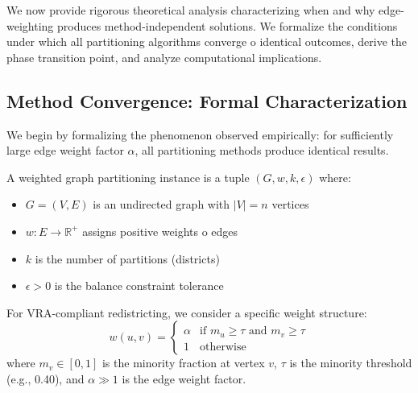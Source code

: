 \label{sec:theory}

We now provide rigorous theoretical analysis characterizing when and why edge-weighting produces method-independent solutions. We formalize the conditions under which all partitioning algorithms converge 	o identical outcomes, derive the phase transition point, and analyze computational implications.

\subsection{Method Convergence: Formal Characterization}

We begin by formalizing the phenomenon observed empirically: for sufficiently large edge weight factor $\alpha$, all partitioning methods produce identical results.

\begin{definition}
A weighted graph partitioning instance is a tuple $(G, w, k, \epsilon)$ where:
\begin{itemize}
    \item $G = (V, E)$ is an undirected graph with $|V| = n$ vertices
    \item $w: E \to \mathbb{R}^+$ assigns positive weights 	o edges
    \item $k$ is the number of partitions (districts)
    \item $\epsilon > 0$ is the balance constraint tolerance
\end{itemize}
\end{definition}

For VRA-compliant redistricting, we consider a specific weight structure:
\[
w(u,v) = \begin{cases}
\alpha & \text{if } m_u \geq \tau \text{ and } m_v \geq \tau \\
1 & \text{otherwise}
\end{cases}
\]
where $m_v \in [0,1]$ is the minority fraction at vertex $v$, $\tau$ is the minority threshold (e.g., 0.40), and $\alpha \gg 1$ is the edge weight factor.

